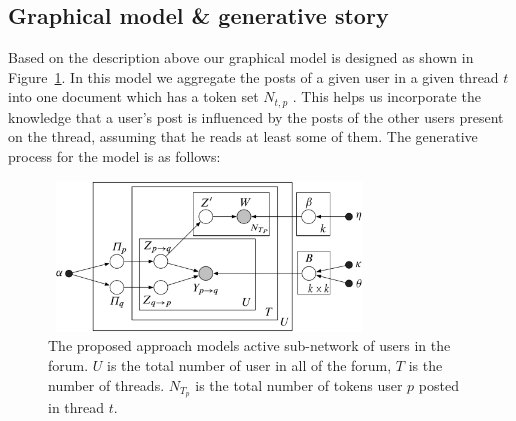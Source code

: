 \documentclass{sig-alternate}
\begin{document}
\subsection{Graphical model \& generative story}
\label{sec:gen-story}
Based on the description above our graphical model is designed as shown
in Figure~\ref{fig:finalThreadAggregationModel}. In this model
we aggregate the posts of 
a given user in a given thread $t$ into one document which has a token
set $N_{t,p}$ . This helps us incorporate the knowledge that a user's post is
influenced by the posts of the other users present on the thread, assuming that
he reads at least some of them.
The generative process for the model is as follows:
\begin{figure}
\centering
\includegraphics[height=4cm,width=8.5cm]{model.pdf}
\vspace*{-2\baselineskip}
\caption{\small{The proposed approach models active sub-network of users in the forum.
$U$ is the total number of user in all of the forum, $T$ is the number of
threads. $N_{T_p}$ is the total number of tokens user $p$ posted in thread $t$.
}}
\vspace*{-2\baselineskip}
\label{fig:finalThreadAggregationModel}
\end{figure}
\end{document}
